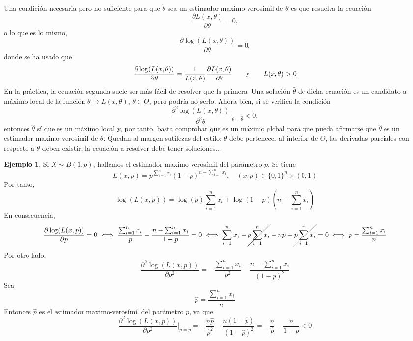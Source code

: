 \documentclass[11pt]{report}
\theoremstyle{definition}
\newtheorem{example}{Ejemplo}
\begin{document}
Una condición necesaria pero no suficiente para que $\hat{\theta}$ sea un estimador maximo-verosímil de $\theta$ es que resuelva la ecuación
\[\frac{\partial L(x,\theta)}{\partial\theta} = 0,\]
o lo que es lo mismo,
\[\frac{\partial\log(L(x,\theta))}{\partial\theta} = 0,\]
donde se ha usado que \[\frac{\partial \log(L(x,\theta))}{\partial \theta} = \frac{1}{L(x,\theta)}\frac{\partial L(x,\theta)}{\partial\theta} \qquad \textup{y} \qquad L(x,\theta) > 0\]
En la práctica, la ecuación segunda suele ser más fácil de resolver que la primera. Una solución $\hat{\theta}$ de dicha ecuación es un candidato a máximo local de la función $\theta \mapsto L(x,\theta)$, $\theta \in \Theta$, pero podría no serlo. Ahora bien, si se verifica la condición
\[\frac{\partial^2\log(L(x,\theta))}{\partial^2\theta}\Bigg|_{\theta=\hat{\theta}} < 0,\]
entonces $\hat{\theta}$ sí que es un máximo local y, por tanto, basta comprobar que es un máximo global para que pueda afirmarse que $\hat{\theta}$ es un estimador maximo-verosímil de $\theta$. Quedan al margen sutilezas del estilo: $\theta$ debe pertenecer al interior de $\Theta$, las derivadas parciales con respecto a $\theta$ deben existir, la ecuación a resolver debe tener soluciones...

\begin{example}
Si $X \sim B(1,p)$, hallemos el estimador maximo-verosímil del parámetro $p$. Se tiene
\[L(x,p) = p^{\sum_{i=1}^n x_i}(1-p)^{n-\sum_{i=1}^n x_i}, \quad (x,p) \in \{0,1\}^n \times (0,1)\]
Por tanto,
\[\log(L(x,p)) = \log(p)\sum_{i=1}^nx_i+\log(1-p)\left(n-\sum_{i=1}^n x_i\right)\]
En consecuencia,
\[\frac{\partial\log(L(x,p))}{\partial p}=0 \iff  \frac{\sum_{i=1}^n x_i}{p}-\frac{n-\sum_{i=1}^nx_i}{1-p}=0 \iff \sum_{i=1}^n x_i-\cancel{p\sum_{i=1}^n x_i}-np+\cancel{p\sum_{i=1}^n x_i} = 0 \iff p = \frac{\sum_{i=1}^n x_i}{n}\]
Por otro lado,
\[\frac{\partial^2\log (L(x,p))}{\partial p^2} = -\frac{\sum_{i=1}^n x_i}{p^2}-\frac{n-\sum_{i=1}^nx_i}{(1- p)^2}\]
Sea
\[\hat{p} = \frac{\sum_{i=1}^n x_i}{n}\]
Entonces $\hat{p}$ es el estimador maximo-verosímil del parámetro $p$, ya que
\[\frac{\partial^2\log (L(x,p))}{\partial p^2}\Bigg|_{p=\hat{p}} = -\frac{n\hat{p}}{\hat{p}^2}-\frac{n(1-\hat{p})}{(1-\hat{p})^2} = -\frac{n}{\hat{p}}-\frac{n}{1-\hat{p}} <0\]

\end{example}
\end{document}
